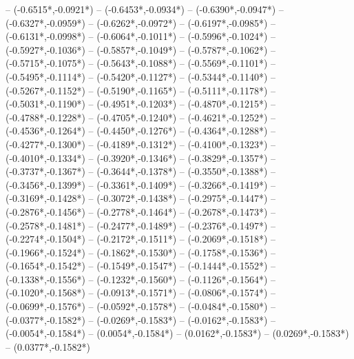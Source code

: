 {	-- ({-0.6515*\dx},{-0.0921*\dy})
	-- ({-0.6453*\dx},{-0.0934*\dy})
	-- ({-0.6390*\dx},{-0.0947*\dy})
	-- ({-0.6327*\dx},{-0.0959*\dy})
	-- ({-0.6262*\dx},{-0.0972*\dy})
	-- ({-0.6197*\dx},{-0.0985*\dy})
	-- ({-0.6131*\dx},{-0.0998*\dy})
	-- ({-0.6064*\dx},{-0.1011*\dy})
	-- ({-0.5996*\dx},{-0.1024*\dy})
	-- ({-0.5927*\dx},{-0.1036*\dy})
	-- ({-0.5857*\dx},{-0.1049*\dy})
	-- ({-0.5787*\dx},{-0.1062*\dy})
	-- ({-0.5715*\dx},{-0.1075*\dy})
	-- ({-0.5643*\dx},{-0.1088*\dy})
	-- ({-0.5569*\dx},{-0.1101*\dy})
	-- ({-0.5495*\dx},{-0.1114*\dy})
	-- ({-0.5420*\dx},{-0.1127*\dy})
	-- ({-0.5344*\dx},{-0.1140*\dy})
	-- ({-0.5267*\dx},{-0.1152*\dy})
	-- ({-0.5190*\dx},{-0.1165*\dy})
	-- ({-0.5111*\dx},{-0.1178*\dy})
	-- ({-0.5031*\dx},{-0.1190*\dy})
	-- ({-0.4951*\dx},{-0.1203*\dy})
	-- ({-0.4870*\dx},{-0.1215*\dy})
	-- ({-0.4788*\dx},{-0.1228*\dy})
	-- ({-0.4705*\dx},{-0.1240*\dy})
	-- ({-0.4621*\dx},{-0.1252*\dy})
	-- ({-0.4536*\dx},{-0.1264*\dy})
	-- ({-0.4450*\dx},{-0.1276*\dy})
	-- ({-0.4364*\dx},{-0.1288*\dy})
	-- ({-0.4277*\dx},{-0.1300*\dy})
	-- ({-0.4189*\dx},{-0.1312*\dy})
	-- ({-0.4100*\dx},{-0.1323*\dy})
	-- ({-0.4010*\dx},{-0.1334*\dy})
	-- ({-0.3920*\dx},{-0.1346*\dy})
	-- ({-0.3829*\dx},{-0.1357*\dy})
	-- ({-0.3737*\dx},{-0.1367*\dy})
	-- ({-0.3644*\dx},{-0.1378*\dy})
	-- ({-0.3550*\dx},{-0.1388*\dy})
	-- ({-0.3456*\dx},{-0.1399*\dy})
	-- ({-0.3361*\dx},{-0.1409*\dy})
	-- ({-0.3266*\dx},{-0.1419*\dy})
	-- ({-0.3169*\dx},{-0.1428*\dy})
	-- ({-0.3072*\dx},{-0.1438*\dy})
	-- ({-0.2975*\dx},{-0.1447*\dy})
	-- ({-0.2876*\dx},{-0.1456*\dy})
	-- ({-0.2778*\dx},{-0.1464*\dy})
	-- ({-0.2678*\dx},{-0.1473*\dy})
	-- ({-0.2578*\dx},{-0.1481*\dy})
	-- ({-0.2477*\dx},{-0.1489*\dy})
	-- ({-0.2376*\dx},{-0.1497*\dy})
	-- ({-0.2274*\dx},{-0.1504*\dy})
	-- ({-0.2172*\dx},{-0.1511*\dy})
	-- ({-0.2069*\dx},{-0.1518*\dy})
	-- ({-0.1966*\dx},{-0.1524*\dy})
	-- ({-0.1862*\dx},{-0.1530*\dy})
	-- ({-0.1758*\dx},{-0.1536*\dy})
	-- ({-0.1654*\dx},{-0.1542*\dy})
	-- ({-0.1549*\dx},{-0.1547*\dy})
	-- ({-0.1444*\dx},{-0.1552*\dy})
	-- ({-0.1338*\dx},{-0.1556*\dy})
	-- ({-0.1232*\dx},{-0.1560*\dy})
	-- ({-0.1126*\dx},{-0.1564*\dy})
	-- ({-0.1020*\dx},{-0.1568*\dy})
	-- ({-0.0913*\dx},{-0.1571*\dy})
	-- ({-0.0806*\dx},{-0.1574*\dy})
	-- ({-0.0699*\dx},{-0.1576*\dy})
	-- ({-0.0592*\dx},{-0.1578*\dy})
	-- ({-0.0484*\dx},{-0.1580*\dy})
	-- ({-0.0377*\dx},{-0.1582*\dy})
	-- ({-0.0269*\dx},{-0.1583*\dy})
	-- ({-0.0162*\dx},{-0.1583*\dy})
	-- ({-0.0054*\dx},{-0.1584*\dy})
	-- ({0.0054*\dx},{-0.1584*\dy})
	-- ({0.0162*\dx},{-0.1583*\dy})
	-- ({0.0269*\dx},{-0.1583*\dy})
	-- ({0.0377*\dx},{-0.1582*\dy})
}

